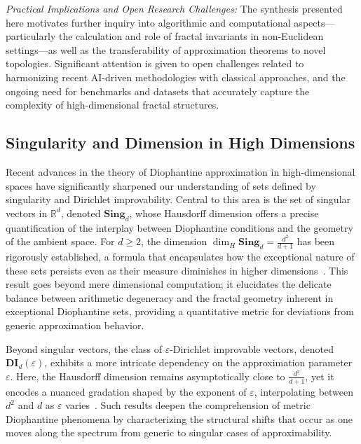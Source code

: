 \documentclass[sigconf]{acmart}
\begin{document}
\textit{Practical Implications and Open Research Challenges:} The synthesis presented here motivates further inquiry into algorithmic and computational aspects—particularly the calculation and role of fractal invariants in non-Euclidean settings—as well as the transferability of approximation theorems to novel topologies. Significant attention is given to open challenges related to harmonizing recent AI-driven methodologies with classical approaches, and the ongoing need for benchmarks and datasets that accurately capture the complexity of high-dimensional fractal structures.


\subsection{Singularity and Dimension in High Dimensions}

Recent advances in the theory of Diophantine approximation in high-dimensional spaces have significantly sharpened our understanding of sets defined by singularity and Dirichlet improvability. Central to this area is the set of singular vectors in $\mathbb{R}^d$, denoted $\mathbf{Sing}_d$, whose Hausdorff dimension offers a precise quantification of the interplay between Diophantine conditions and the geometry of the ambient space. For $d \geq 2$, the dimension $\dim_H \mathbf{Sing}_d = \frac{d^2}{d+1}$ has been rigorously established, a formula that encapsulates how the exceptional nature of these sets persists even as their measure diminishes in higher dimensions~\cite{ref109}. This result goes beyond mere dimensional computation; it elucidates the delicate balance between arithmetic degeneracy and the fractal geometry inherent in exceptional Diophantine sets, providing a quantitative metric for deviations from generic approximation behavior.

Beyond singular vectors, the class of $\varepsilon$-Dirichlet improvable vectors, denoted $\mathbf{DI}_d(\varepsilon)$, exhibits a more intricate dependency on the approximation parameter $\varepsilon$. Here, the Hausdorff dimension remains asymptotically close to $\frac{d^2}{d+1}$, yet it encodes a nuanced gradation shaped by the exponent of $\varepsilon$, interpolating between $d^2$ and $d$ as $\varepsilon$ varies~\cite{ref109}. Such results deepen the comprehension of metric Diophantine phenomena by characterizing the structural shifts that occur as one moves along the spectrum from generic to singular cases of approximability.
\end{document}
